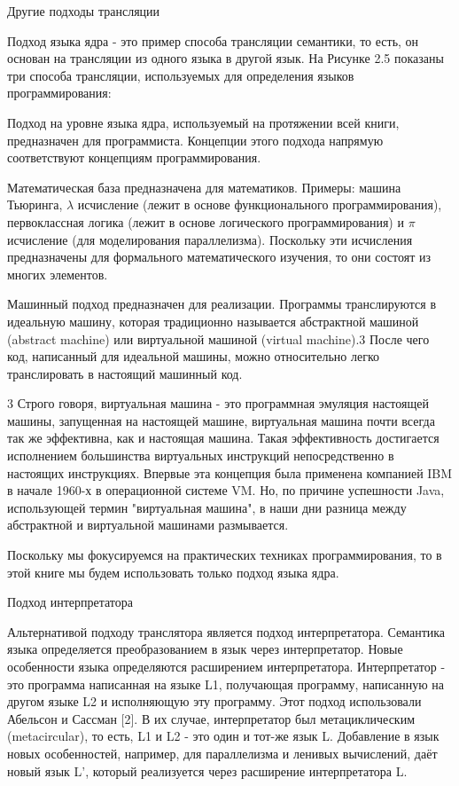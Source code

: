Другие подходы трансляции

Подход языка ядра - это пример способа трансляции семантики, то есть, он основан на трансляции из одного языка в другой язык. На Рисунке 2.5 показаны три способа трансляции, используемых для определения языков программирования:

Подход на уровне языка ядра, используемый на протяжении всей книги, предназначен для программиста. Концепции этого подхода напрямую соответствуют концепциям программирования.

Математическая база предназначена для математиков. Примеры: машина Тьюринга, $\lambda$ исчисление (лежит в основе функционального программирования), первоклассная логика (лежит в основе логического программирования) и $\pi$ исчисление (для моделирования параллелизма). Поскольку эти исчисления предназначены для формального математического изучения, то они состоят из многих элементов.

Машинный подход предназначен для реализации. Программы транслируются в идеальную машину, которая традиционно называется абстрактной машиной (abstract machine) или виртуальной машиной (virtual machine).3 После чего код, написанный для идеальной машины, можно относительно легко транслировать в настоящий машинный код.

3 Строго говоря, виртуальная машина - это программная эмуляция настоящей машины, запущенная на настоящей машине, виртуальная машина почти всегда так же эффективна, как и настоящая машина. Такая эффективность достигается исполнением большинства виртуальных инструкций непосредственно в настоящих инструкциях. Впервые эта концепция была применена компанией IBM в начале 1960-х в операционной системе VM. Но, по причине успешности Java, использующей термин "виртуальная машина", в наши дни разница между абстрактной и виртуальной машинами размывается.

Поскольку мы фокусируемся на практических техниках программирования, то в этой книге мы будем использовать только подход языка ядра.

Подход интерпретатора

Альтернативой подходу транслятора является подход интерпретатора. Семантика языка определяется преобразованием в язык через интерпретатор. Новые особенности языка определяются расширением интерпретатора. Интерпретатор - это программа написанная на языке L1, получающая программу, написанную на другом языке L2 и исполняющую эту программу. Этот подход использовали Абельсон и Сассман [2]. В их случае, интерпретатор был метациклическим (metacircular), то есть, L1 и L2 - это один и тот-же язык L. Добавление в язык новых особенностей, например, для параллелизма и ленивых вычислений, даёт новый язык L', который реализуется через расширение интерпретатора L.

